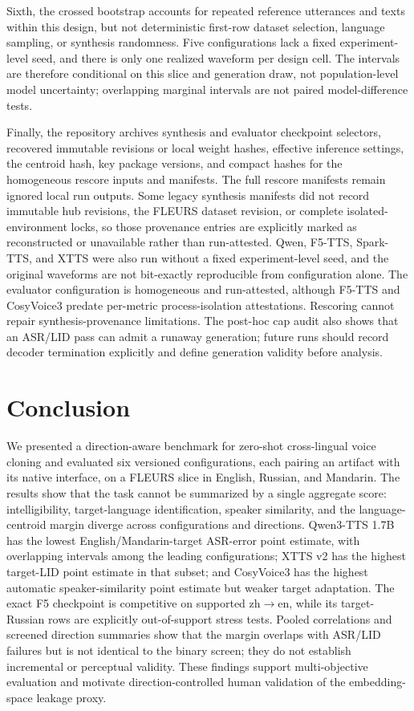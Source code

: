 \documentclass[11pt]{article}
\begin{document}
Sixth, the crossed bootstrap accounts for repeated reference utterances and texts within this design, but not deterministic first-row dataset selection, language sampling, or synthesis randomness. Five configurations lack a fixed experiment-level seed, and there is only one realized waveform per design cell. The intervals are therefore conditional on this slice and generation draw, not population-level model uncertainty; overlapping marginal intervals are not paired model-difference tests.

Finally, the repository archives synthesis and evaluator checkpoint selectors, recovered immutable revisions or local weight hashes, effective inference settings, the centroid hash, key package versions, and compact hashes for the homogeneous rescore inputs and manifests. The full rescore manifests remain ignored local run outputs. Some legacy synthesis manifests did not record immutable hub revisions, the FLEURS dataset revision, or complete isolated-environment locks, so those provenance entries are explicitly marked as reconstructed or unavailable rather than run-attested. Qwen, F5-TTS, Spark-TTS, and XTTS were also run without a fixed experiment-level seed, and the original waveforms are not bit-exactly reproducible from configuration alone. The evaluator configuration is homogeneous and run-attested, although F5-TTS and CosyVoice3 predate per-metric process-isolation attestations. Rescoring cannot repair synthesis-provenance limitations. The post-hoc cap audit also shows that an ASR/LID pass can admit a runaway generation; future runs should record decoder termination explicitly and define generation validity before analysis.

\FloatBarrier

\section{Conclusion}

We presented a direction-aware benchmark for zero-shot cross-lingual voice cloning and evaluated six versioned configurations, each pairing an artifact with its native interface, on a FLEURS slice in English, Russian, and Mandarin. The results show that the task cannot be summarized by a single aggregate score: intelligibility, target-language identification, speaker similarity, and the language-centroid margin diverge across configurations and directions. Qwen3-TTS 1.7B has the lowest English/Mandarin-target ASR-error point estimate, with overlapping intervals among the leading configurations; XTTS v2 has the highest target-LID point estimate in that subset; and CosyVoice3 has the highest automatic speaker-similarity point estimate but weaker target adaptation. The exact F5 checkpoint is competitive on supported zh$\rightarrow$en, while its target-Russian rows are explicitly out-of-support stress tests. Pooled correlations and screened direction summaries show that the margin overlaps with ASR/LID failures but is not identical to the binary screen; they do not establish incremental or perceptual validity. These findings support multi-objective evaluation and motivate direction-controlled human validation of the embedding-space leakage proxy.
\end{document}
